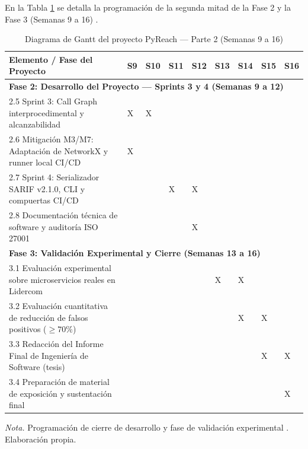 En la Tabla \ref{tab:gantt_bloque2} se detalla la programación de la segunda mitad de la Fase 2 y la Fase 3 (Semanas 9 a 16) \parencite{torres2026proyecto}. %

\begin{table}[H]
\centering
\caption{Diagrama de Gantt del proyecto PyReach — Parte 2 (Semanas 9 a 16)}
\label{tab:gantt_bloque2}
\footnotesize
\singlespacing
\setlength{\tabcolsep}{2.5pt}
\renewcommand{\arraystretch}{1.10}
\begin{tabularx}{\textwidth}{|X|*{8}{>{\centering\arraybackslash}p{0.62cm}|}}
\hline
\textbf{Elemento / Fase del Proyecto} & \textbf{S9} & \textbf{S10} & \textbf{S11} & \textbf{S12} & \textbf{S13} & \textbf{S14} & \textbf{S15} & \textbf{S16} \\
\hline
\multicolumn{9}{|l|}{\textbf{Fase 2: Desarrollo del Proyecto — Sprints 3 y 4 (Semanas 9 a 12)}} \\
\hline
2.5 Sprint 3: Call Graph interprocedimental y alcanzabilidad & X & X & & & & & & \\
\hline
2.6 Mitigación M3/M7: Adaptación de NetworkX y runner local CI/CD & X & & & & & & & \\
\hline
2.7 Sprint 4: Serializador SARIF v2.1.0, CLI y compuertas CI/CD & & & X & X & & & & \\
\hline
2.8 Documentación técnica de software y auditoría ISO 27001 & & & & X & & & & \\
\hline
\multicolumn{9}{|l|}{\textbf{Fase 3: Validación Experimental y Cierre (Semanas 13 a 16)}} \\
\hline
3.1 Evaluación experimental sobre microservicios reales en Lidercom & & & & & X & X & & \\
\hline
3.2 Evaluación cuantitativa de reducción de falsos positivos ($\ge 70\%$) & & & & & & X & X & \\
\hline
3.3 Redacción del Informe Final de Ingeniería de Software (tesis) & & & & & & & X & X \\
\hline
3.4 Preparación de material de exposición y sustentación final & & & & & & & & X \\
\hline
\end{tabularx}
\vspace{2pt}
\begin{flushleft}
\scriptsize \textit{Nota.} Programación de cierre de desarrollo y fase de validación experimental \parencite{torres2026proyecto}. Elaboración propia. %
\end{flushleft}
\end{table}

